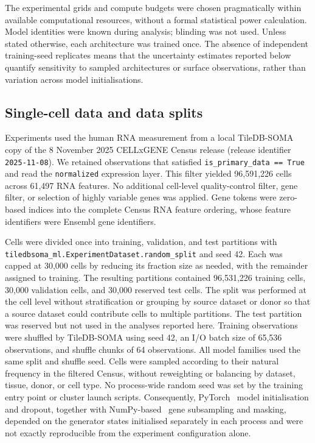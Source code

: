\documentclass[pdflatex,sn-nature]{sn-jnl}%
\theoremstyle{thmstyleone}%
\theoremstyle{thmstyletwo}%
\theoremstyle{thmstylethree}%
\begin{document}
The experimental grids and compute budgets were chosen pragmatically within available computational resources, without a formal statistical power calculation.
Model identities were known during analysis; blinding was not used.
Unless stated otherwise, each architecture was trained once.
The absence of independent training-seed replicates means that the uncertainty estimates reported below quantify sensitivity to sampled architectures or surface observations, rather than variation across model initialisations.

\subsection{Single-cell data and data splits}

Experiments used the human RNA measurement from a local TileDB-SOMA copy of the 8 November 2025 CELLxGENE Census release (release identifier \texttt{2025-11-08}).
We retained observations that satisfied \texttt{is\_primary\_data == True} and read the \texttt{normalized} expression layer.
This filter yielded 96,591,226 cells across 61,497 RNA features.
No additional cell-level quality-control filter, gene filter, or selection of highly variable genes was applied.
Gene tokens were zero-based indices into the complete Census RNA feature ordering, whose feature identifiers were Ensembl gene identifiers.

Cells were divided once into training, validation, and test partitions with \texttt{tiledbsoma\_ml.ExperimentDataset.random\_split} and seed 42.
Each was capped at 30,000 cells by reducing its fraction size as needed, with the remainder assigned to training.
The resulting partitions contained 96,531,226 training cells, 30,000 validation cells, and 30,000 reserved test cells.
The split was performed at the cell level without stratification or grouping by source dataset or donor so that a source dataset could contribute cells to multiple partitions.
The test partition was reserved but not used in the analyses reported here.
Training observations were shuffled by TileDB-SOMA using seed 42, an I/O batch size of 65,536 observations, and shuffle chunks of 64 observations.
All model families used the same split and shuffle seed.
Cells were sampled according to their natural frequency in the filtered Census, without reweighting or balancing by dataset, tissue, donor, or cell type.
No process-wide random seed was set by the training entry point or cluster launch scripts.
Consequently, PyTorch~\cite{paszke2019pytorchimperativestylehighperformance} model initialisation and dropout, together with NumPy-based~\cite{harris2020array} gene subsampling and masking, depended on the generator states initialised separately in each process and were not exactly reproducible from the experiment configuration alone.
\end{document}

